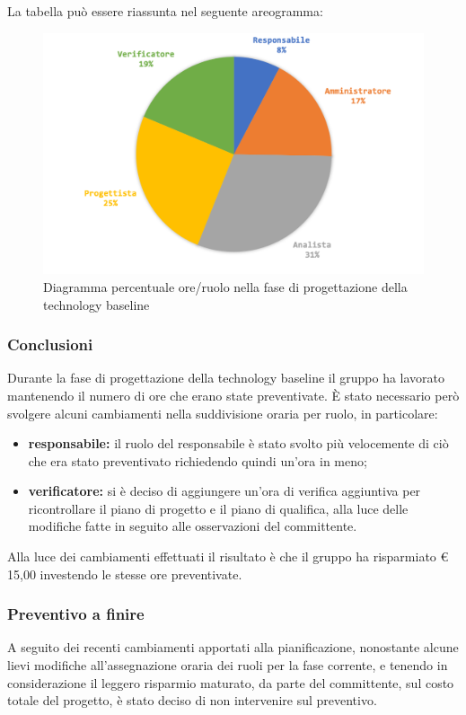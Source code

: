 			La tabella può essere riassunta nel seguente areogramma:
			\begin{figure}[H]
				\centering
				\includegraphics[width=0.8\linewidth]{images/consuntivo/ConsCorrez2.png}
				\caption{Diagramma percentuale ore/ruolo nella fase di progettazione della technology baseline}
				\label{fig:consuntivo diagramma costi ruolo fase progettazione della technology baseline}
			\end{figure}

		\subsubsection{Conclusioni}
			Durante la fase di progettazione della technology baseline il gruppo ha lavorato mantenendo il numero di ore che erano state preventivate. È stato necessario però svolgere alcuni cambiamenti nella suddivisione oraria per ruolo, in particolare:
			\begin{itemize}
				\item \textbf{responsabile:} il ruolo del responsabile è stato svolto più velocemente di ciò che era stato preventivato richiedendo quindi un'ora in meno;
				\item \textbf{verificatore:} si è deciso di aggiungere un'ora di verifica aggiuntiva per ricontrollare il piano di progetto e il piano di qualifica, alla luce delle modifiche fatte in seguito alle osservazioni del committente.
			\end{itemize}
			Alla luce dei cambiamenti effettuati il risultato è che il gruppo ha risparmiato € 15,00 investendo le stesse ore preventivate.
		
		\subsubsection{Preventivo a finire}
			A seguito dei recenti cambiamenti apportati alla pianificazione, nonostante alcune lievi modifiche all'assegnazione oraria dei ruoli per la fase corrente, e tenendo in considerazione il leggero risparmio maturato, da parte del committente, sul costo totale del progetto, è stato deciso di non intervenire sul preventivo.	
			
